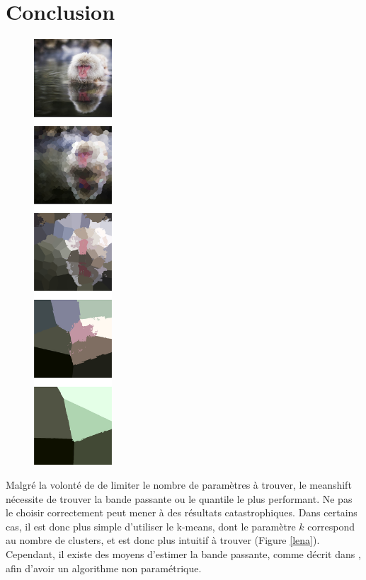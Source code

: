 \documentclass{article}
\begin{document}
\newpage
\section{Conclusion}

\begin{figure}
\includegraphics[width=110px]{images/white_baboon.png}
\end{figure}

Malgré la volonté de \cite{my_article} de limiter le nombre de paramètres à
trouver, le meanshift nécessite de trouver la bande passante ou le quantile le
plus performant. Ne pas le choisir correctement peut mener à des résultats
catastrophiques. Dans certains cas, il est donc plus simple d'utiliser le
k-means, dont le paramètre $k$ correspond au nombre de clusters, et est donc
plus intuitif à trouver (Figure \ref{lena}). \\
Cependant, il existe des moyens d'estimer la bande passante, comme décrit dans
\cite{fastnonparametric}, afin d'avoir un algorithme non paramétrique.


\end{document}
